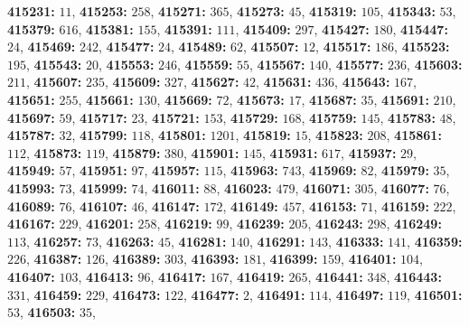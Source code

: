 \textsf{\bfseries 415231:} $11$, \textsf{\bfseries 415253:} $258$, \textsf{\bfseries 415271:} $365$, \textsf{\bfseries 415273:} $45$, \textsf{\bfseries 415319:} $105$, \textsf{\bfseries 415343:} $53$, \textsf{\bfseries 415379:} $616$, \textsf{\bfseries 415381:} $155$, \textsf{\bfseries 415391:} $111$, \textsf{\bfseries 415409:} $297$, \textsf{\bfseries 415427:} $180$, \textsf{\bfseries 415447:} $24$, \textsf{\bfseries 415469:} $242$, \textsf{\bfseries 415477:} $24$, \textsf{\bfseries 415489:} $62$, \textsf{\bfseries 415507:} $12$, \textsf{\bfseries 415517:} $186$, \textsf{\bfseries 415523:} $195$, \textsf{\bfseries 415543:} $20$, \textsf{\bfseries 415553:} $246$, \textsf{\bfseries 415559:} $55$, \textsf{\bfseries 415567:} $140$, \textsf{\bfseries 415577:} $236$, \textsf{\bfseries 415603:} $211$, \textsf{\bfseries 415607:} $235$, \textsf{\bfseries 415609:} $327$, \textsf{\bfseries 415627:} $42$, \textsf{\bfseries 415631:} $436$, \textsf{\bfseries 415643:} $167$, \textsf{\bfseries 415651:} $255$, \textsf{\bfseries 415661:} $130$, \textsf{\bfseries 415669:} $72$, \textsf{\bfseries 415673:} $17$, \textsf{\bfseries 415687:} $35$, \textsf{\bfseries 415691:} $210$, \textsf{\bfseries 415697:} $59$, \textsf{\bfseries 415717:} $23$, \textsf{\bfseries 415721:} $153$, \textsf{\bfseries 415729:} $168$, \textsf{\bfseries 415759:} $145$, \textsf{\bfseries 415783:} $48$, \textsf{\bfseries 415787:} $32$, \textsf{\bfseries 415799:} $118$, \textsf{\bfseries 415801:} $1201$, \textsf{\bfseries 415819:} $15$, \textsf{\bfseries 415823:} $208$, \textsf{\bfseries 415861:} $112$, \textsf{\bfseries 415873:} $119$, \textsf{\bfseries 415879:} $380$, \textsf{\bfseries 415901:} $145$, \textsf{\bfseries 415931:} $617$, \textsf{\bfseries 415937:} $29$, \textsf{\bfseries 415949:} $57$, \textsf{\bfseries 415951:} $97$, \textsf{\bfseries 415957:} $115$, \textsf{\bfseries 415963:} $743$, \textsf{\bfseries 415969:} $82$, \textsf{\bfseries 415979:} $35$, \textsf{\bfseries 415993:} $73$, \textsf{\bfseries 415999:} $74$, \textsf{\bfseries 416011:} $88$, \textsf{\bfseries 416023:} $479$, \textsf{\bfseries 416071:} $305$, \textsf{\bfseries 416077:} $76$, \textsf{\bfseries 416089:} $76$, \textsf{\bfseries 416107:} $46$, \textsf{\bfseries 416147:} $172$, \textsf{\bfseries 416149:} $457$, \textsf{\bfseries 416153:} $71$, \textsf{\bfseries 416159:} $222$, \textsf{\bfseries 416167:} $229$, \textsf{\bfseries 416201:} $258$, \textsf{\bfseries 416219:} $99$, \textsf{\bfseries 416239:} $205$, \textsf{\bfseries 416243:} $298$, \textsf{\bfseries 416249:} $113$, \textsf{\bfseries 416257:} $73$, \textsf{\bfseries 416263:} $45$, \textsf{\bfseries 416281:} $140$, \textsf{\bfseries 416291:} $143$, \textsf{\bfseries 416333:} $141$, \textsf{\bfseries 416359:} $226$, \textsf{\bfseries 416387:} $126$, \textsf{\bfseries 416389:} $303$, \textsf{\bfseries 416393:} $181$, \textsf{\bfseries 416399:} $159$, \textsf{\bfseries 416401:} $104$, \textsf{\bfseries 416407:} $103$, \textsf{\bfseries 416413:} $96$, \textsf{\bfseries 416417:} $167$, \textsf{\bfseries 416419:} $265$, \textsf{\bfseries 416441:} $348$, \textsf{\bfseries 416443:} $331$, \textsf{\bfseries 416459:} $229$, \textsf{\bfseries 416473:} $122$, \textsf{\bfseries 416477:} $2$, \textsf{\bfseries 416491:} $114$, \textsf{\bfseries 416497:} $119$, \textsf{\bfseries 416501:} $53$, \textsf{\bfseries 416503:} $35$, 
